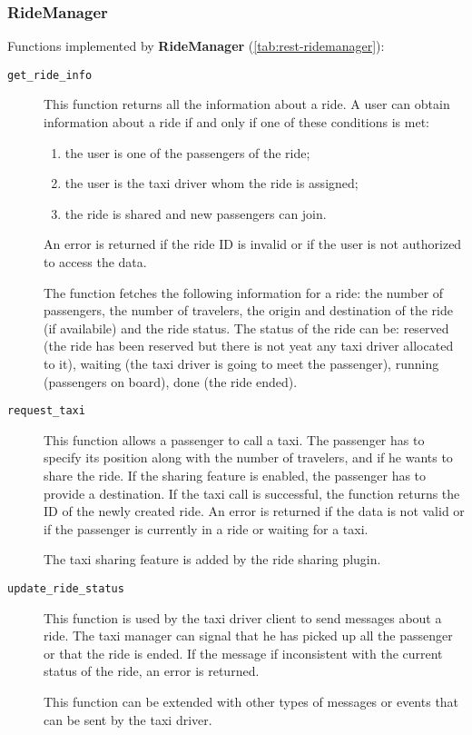 \subsubsection{RideManager}
Functions implemented by \textbf{RideManager} (\autoref{tab:rest-ridemanager}):
\begin{description}
    \item[\texttt{get\_ride\_info}] This function returns all the information about a ride. A user can obtain information about a ride if and only if one of these conditions is met:
    \begin{enumerate}
        \item the user is one of the passengers of the ride;
        \item the user is the taxi driver whom the ride is assigned;
        \item the ride is shared and new passengers can join.
    \end{enumerate}
    An error is returned if the ride ID is invalid or if the user is not authorized to access the data.

    The function fetches the following information for a ride: the number of passengers, the number of travelers, the origin and destination of the ride (if availabile) and the ride status. The status of the ride can be: reserved (the ride has been reserved but there is not yeat any taxi driver allocated to it), waiting (the taxi driver is going to meet the passenger), running (passengers on board), done (the ride ended).

    \item[\texttt{request\_taxi}] This function allows a passenger to call a taxi. The passenger has to specify its position along with the number of travelers, and if he wants to share the ride. If the sharing feature is enabled, the passenger has to provide a destination. If the taxi call is successful, the function returns the ID of the newly created ride. An error is returned if the data is not valid or if the passenger is currently in a ride or waiting for a taxi.

    The taxi sharing feature is added by the ride sharing plugin.

    \item[\texttt{update\_ride\_status}] This function is used by the taxi driver client to send messages about a ride. The taxi manager can signal that he has picked up all the passenger or that the ride is ended. If the message if inconsistent with the current status of the ride, an error is returned.

    This function can be extended with other types of messages or events that can be sent by the taxi driver.
\end{description}

